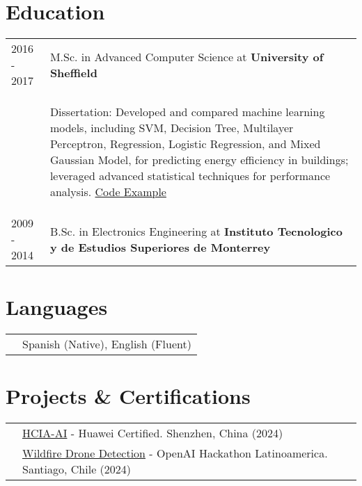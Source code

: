 \documentclass[a4paper,12pt]{article}
\begin{document}
\section{Education}
\begin{tabularx}{\linewidth}{@{}l X@{}}	
    2016 - 2017 & M.Sc. in Advanced Computer Science at \textbf{University of Sheffield} \hfill \\
    & \begin{itemize}[nosep, leftmargin=*]
        Dissertation: Developed and compared machine learning models, including SVM, Decision Tree, Multilayer Perceptron, Regression, Logistic Regression, and Mixed Gaussian Model, for predicting energy efficiency in buildings; leveraged advanced statistical techniques for performance analysis. \href{https://github.com/dcerdac/DissertationCode}{Code Example}
    \end{itemize} \\
    2009 - 2014 & B.Sc. in Electronics Engineering at \textbf{Instituto Tecnologico y de Estudios Superiores de Monterrey} \hfill \\ 
    \end{tabularx}

\section{Languages}
\begin{tabularx}{\linewidth}{@{}l X@{}}
& \normalsize{Spanish (Native), English (Fluent)}\\
\end{tabularx}

\section{Projects \& Certifications}

\begin{tabularx}{\linewidth}{@{}l X@{}}
& \normalsize{\href{https://github.com/dcerdac/MachineLearningProjects/blob/master/010102001521809623012377209.pdf}{HCIA-AI} - Huawei Certified. Shenzhen, China (2024)}\\
& \normalsize{\href{https://github.com/dcerdac/keepnai}{Wildfire Drone Detection} - OpenAI Hackathon Latinoamerica. Santiago, Chile (2024)}\\

\end{tabularx}
\end{document}
